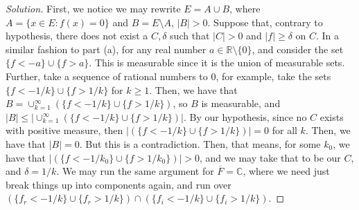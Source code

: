\documentclass[10pt]{article}
\begin{document}
\begin{proof}[Solution]


First, we notice we may rewrite $E = A \cup B$, where $A = \{ x \in E : f(x) = 0 \}$ and $B = E \setminus A$, $|B| > 0$. Suppose that, contrary to hypothesis, there does not exist a $C, \delta$ such that $|C| > 0$ and $|f| \geq \delta$ on  $C$. In a similar fashion to part (a), for any real number $a \in \mathbb{R} \setminus \{ 0 \}$, and consider the set $\{ f < -a \} \cup \{ f > a \}$. This is measurable since it is the union of measurable sets. Further, take a sequence of rational numbers to $0$, for example, take the sets  $\{ f < -1/k \} \cup \{ f > 1/k \}$ for $k \geq 1$. Then, we have that $B = \cup_{k=1}^\infty (\{ f < -1/k \} \cup \{ f > 1/k \})$, so $B$ is measurable, and $|B| \leq |\cup_{k=1}^\infty (\{ f < -1/k \} \cup \{ f > 1/k \})|$. By our hypothesis, since no $C$ exists with positive measure, then $| (\{ f < -1/k \} \cup \{ f > 1/k \})| = 0$ for all $k$. Then, we have that $|B| = 0$. But this is a contradiction. Then, that means, for some $k_0$, we have that  $| (\{ f < -1/k_0 \} \cup \{ f > 1/k_0 \})|  > 0$, and we may take that to be our $C$, and $\delta = 1/k$. We may run the same argument for $\overline{F} = \mathbb{C}$, where we need just break things up into components again, and run over  $(\{ f_r < -1/k \} \cup \{ f_r > 1/k \}) \cap  (\{ f_i < -1/k \} \cup \{ f_i > 1/k \})$.
\end{proof}
\end{document}

